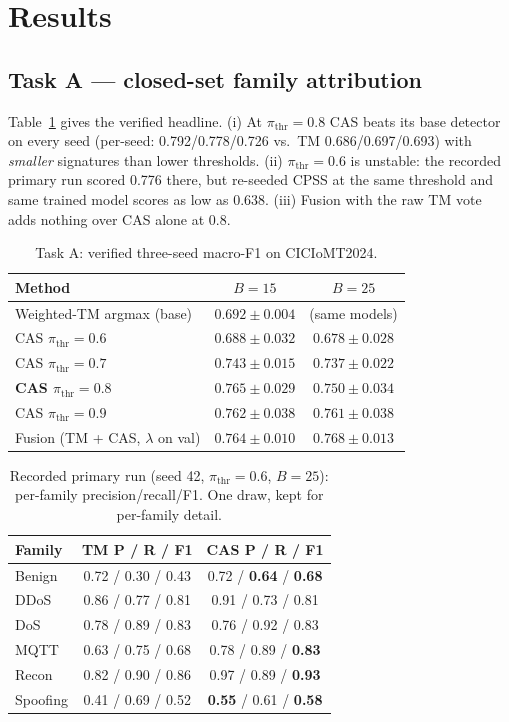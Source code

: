 \documentclass[conference]{IEEEtran}
\begin{document}
\section{Results}
\subsection{Task A --- closed-set family attribution}
\label{sec:taska}
Table~\ref{tab:headline} gives the verified headline. (i) At
$\pi_{\mathrm{thr}}{=}0.8$ CAS beats its base detector on every seed
(per-seed: 0.792/0.778/0.726 vs.\ TM 0.686/0.697/0.693) with \emph{smaller}
signatures than lower thresholds. (ii) $\pi_{\mathrm{thr}}{=}0.6$ is
unstable: the recorded primary run scored 0.776 there, but re-seeded CPSS at
the same threshold and same trained model scores as low as 0.638.
(iii) Fusion with the raw TM vote adds nothing over CAS alone at 0.8.

\begin{table}[t]
\centering
\caption{Task A: verified three-seed macro-F1 on CICIoMT2024.}
\label{tab:headline}
\begin{tabular}{lcc}
\toprule
Method & $B{=}15$ & $B{=}25$ \\
\midrule
Weighted-TM argmax (base) & $0.692 \pm 0.004$ & (same models) \\
CAS $\pi_{\mathrm{thr}}{=}0.6$ & $0.688 \pm 0.032$ & $0.678 \pm 0.028$ \\
CAS $\pi_{\mathrm{thr}}{=}0.7$ & $0.743 \pm 0.015$ & $0.737 \pm 0.022$ \\
\textbf{CAS $\pi_{\mathrm{thr}}{=}0.8$} & $\mathbf{0.765 \pm 0.029}$ & $0.750 \pm 0.034$ \\
CAS $\pi_{\mathrm{thr}}{=}0.9$ & $0.762 \pm 0.038$ & $0.761 \pm 0.038$ \\
Fusion (TM + CAS, $\lambda$ on val) & $0.764 \pm 0.010$ & $0.768 \pm 0.013$ \\
\bottomrule
\end{tabular}
\end{table}

\begin{table}[t]
\centering
\caption{Recorded primary run (seed 42, $\pi_{\mathrm{thr}}{=}0.6$, $B{=}25$):
per-family precision/recall/F1. One draw, kept for per-family detail.}
\label{tab:perfamily}
\begin{tabular}{lcc}
\toprule
Family & TM P / R / F1 & CAS P / R / F1 \\
\midrule
Benign   & 0.72 / 0.30 / 0.43 & 0.72 / \textbf{0.64} / \textbf{0.68} \\
DDoS     & 0.86 / 0.77 / 0.81 & 0.91 / 0.73 / 0.81 \\
DoS      & 0.78 / 0.89 / 0.83 & 0.76 / 0.92 / 0.83 \\
MQTT     & 0.63 / 0.75 / 0.68 & 0.78 / 0.89 / \textbf{0.83} \\
Recon    & 0.82 / 0.90 / 0.86 & 0.97 / 0.89 / \textbf{0.93} \\
Spoofing & 0.41 / 0.69 / 0.52 & \textbf{0.55} / 0.61 / \textbf{0.58} \\
\bottomrule
\end{tabular}
\end{table}
\end{document}

